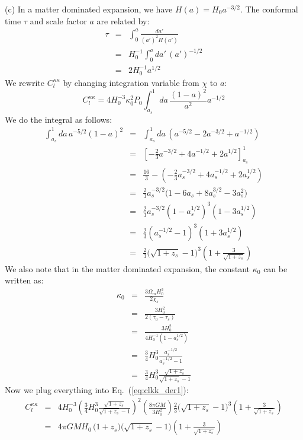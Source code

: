 \documentclass[aps,prd,superscriptaddress,groupedaddress,nofootinbib,nobibnotes]{revtex4}
\newcommand{\be}{\begin{equation}}
\newcommand{\ee}{\end{equation}}
\newcommand{\ba}{\begin{eqnarray}}
\newcommand{\ea}{\end{eqnarray}}
\newcommand{\nn}{\nonumber}
\begin{document}
\begin{enumerate}
(c)
In a matter dominated expansion, we have $H(a) = H_0 a^{-3/2}$.  The conformal time $\tau$ and scale factor $a$ are related by:
\ba
\tau 
  &=& \int_0^a \frac{da'}{(a')^2 H(a')} \nn \\
  &=& H_0^{-1} \int_0^a da' \, (a')^{-1/2} \nn \\
  &=& 2 H_0^{-1} a^{1/2}
\ea
We rewrite $C_l^{\kappa\kappa}$ by changing integration variable from $\chi$ to $a$:
\be
C_l^{\kappa\kappa} 
  = 4 H_0^{-3} \kappa_0^2 P_0 \int_{a_s}^1 da \, \frac{(1-a)^2}{a^2} a^{-1/2}  \label{eq:clkk_der1}
\ee
We do the integral as follows:
\ba
\int_{a_s}^1 da \, a^{-5/2} (1-a)^2 
  &=& \int_{a_s}^1 da \, (a^{-5/2} - 2 a^{-3/2} + a^{-1/2}) \nn \\
  &=& \left[ -\frac{2}{3} a^{-3/2} + 4 a^{-1/2} + 2 a^{1/2} \right]_{a_s}^1 \nn \\
  &=& \frac{16}{3} - \left( -\frac{2}{3} a_s^{-3/2} + 4 a_s^{-1/2} + 2 a_s^{1/2} \right) \nn \\
  &=& \frac{2}{3} a_s^{-3/2} \big( 1 - 6 a_s + 8 a_s^{3/2} - 3 a_s^2 \big) \nn \\
  &=& \frac{2}{3} a_s^{-3/2} (1 - a_s^{1/2})^3 (1 - 3 a_s^{1/2}) \nn \\
  &=& \frac{2}{3} (a_s^{-1/2} - 1)^3 (1 + 3 a_s^{1/2}) \nn \\
  &=& \frac{2}{3} \Big( \sqrt{1+z_s} - 1 \Big)^3 \left( 1 + \frac{3}{\sqrt{1+z_s}} \right)
\ea
We also note that in the matter dominated expansion, the constant $\kappa_0$ can be written as:
\ba
\kappa_0
  &=& \frac{3 \Omega_m H_0^2}{2 \chi_s} \nn \\
  &=& \frac{3 H_0^2}{2 (\tau_0 - \tau_s)} \nn \\
  &=& \frac{3 H_0^2}{4 H_0^{-1} (1 - a_s^{1/2})} \nn \\
  &=& \frac{3}{4} H_0^3 \frac{a_s^{-1/2}}{a_s^{-1/2} - 1} \nn \\
  &=& \frac{3}{4} H_0^3 \frac{\sqrt{1+z_s}}{\sqrt{1+z_s}-1}
\ea
Now we plug everything into Eq.~(\ref{eq:clkk_der1}):
\ba
C_l^{\kappa\kappa} &=&
  4 H_0^{-3} \left( \frac{3}{4} H_0^3 \frac{\sqrt{1+z_s}}{\sqrt{1+z_s}-1} \right)^2 \left( \frac{8 \pi G M}{3 H_0^2} \right) 
   \frac{2}{3} \Big( \sqrt{1+z_s} - 1 \Big)^3 \left( 1 + \frac{3}{\sqrt{1+z_s}} \right) \nn \\
 &=& 4\pi G M H_0 \, \Big( 1 + z_s \Big) \Big( \sqrt{1+z_s} - 1 \Big) \left( 1 + \frac{3}{\sqrt{1+z_s}} \right)
\ea

\end{enumerate}
\end{document}
